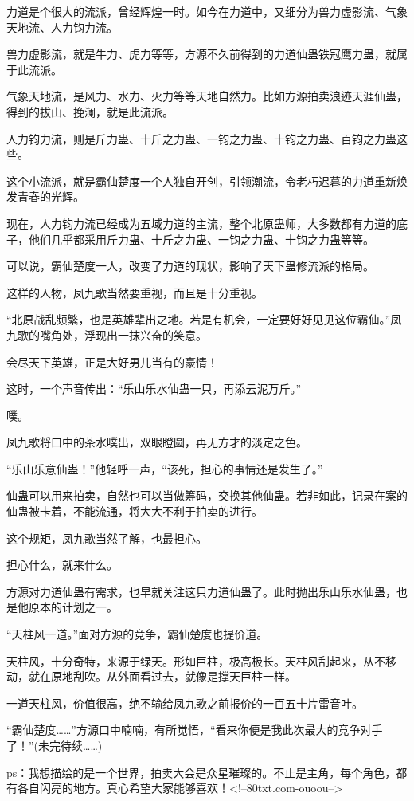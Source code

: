 \begin{this_body}
力道是个很大的流派，曾经辉煌一时。如今在力道中，又细分为兽力虚影流、气象天地流、人力钧力流。

兽力虚影流，就是牛力、虎力等等，方源不久前得到的力道仙蛊铁冠鹰力蛊，就属于此流派。

气象天地流，是风力、水力、火力等等天地自然力。比如方源拍卖浪迹天涯仙蛊，得到的拔山、挽澜，就是此流派。

人力钧力流，则是斤力蛊、十斤之力蛊、一钧之力蛊、十钧之力蛊、百钧之力蛊这些。

这个小流派，就是霸仙楚度一个人独自开创，引领潮流，令老朽迟暮的力道重新焕发青春的光辉。

现在，人力钧力流已经成为五域力道的主流，整个北原蛊师，大多数都有力道的底子，他们几乎都采用斤力蛊、十斤之力蛊、一钧之力蛊、十钧之力蛊等等。

可以说，霸仙楚度一人，改变了力道的现状，影响了天下蛊修流派的格局。

这样的人物，凤九歌当然要重视，而且是十分重视。

“北原战乱频繁，也是英雄辈出之地。若是有机会，一定要好好见见这位霸仙。”凤九歌的嘴角处，浮现出一抹兴奋的笑意。

会尽天下英雄，正是大好男儿当有的豪情！

这时，一个声音传出：“乐山乐水仙蛊一只，再添云泥万斤。”

噗。

凤九歌将口中的茶水噗出，双眼瞪圆，再无方才的淡定之色。

“乐山乐意仙蛊！”他轻呼一声，“该死，担心的事情还是发生了。”

仙蛊可以用来拍卖，自然也可以当做筹码，交换其他仙蛊。若非如此，记录在案的仙蛊被卡着，不能流通，将大大不利于拍卖的进行。

这个规矩，凤九歌当然了解，也最担心。

担心什么，就来什么。

方源对力道仙蛊有需求，也早就关注这只力道仙蛊了。此时抛出乐山乐水仙蛊，也是他原本的计划之一。

“天柱风一道。”面对方源的竞争，霸仙楚度也提价道。

天柱风，十分奇特，来源于绿天。形如巨柱，极高极长。天柱风刮起来，从不移动，就在原地刮吹。从外面看过去，就像是撑天巨柱一样。

一道天柱风，价值很高，绝不输给凤九歌之前报价的一百五十片雷音叶。

“霸仙楚度……”方源口中喃喃，有所觉悟，“看来你便是我此次最大的竞争对手了！”(未完待续……)

ps：我想描绘的是一个世界，拍卖大会是众星璀璨的。不止是主角，每个角色，都有各自闪亮的地方。真心希望大家能够喜欢！<!--80txt.com-ouoou-->

\end{this_body}

